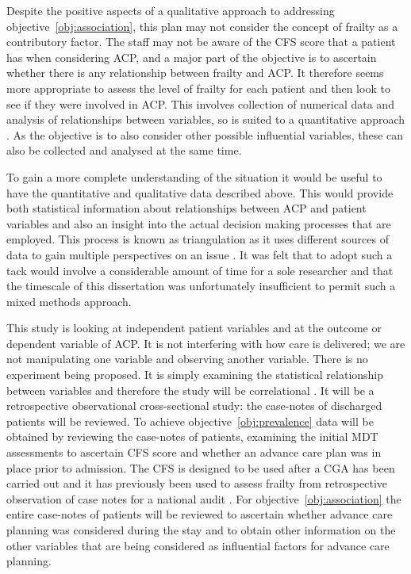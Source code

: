 \documentclass
[
	12pt,
	a4paper,
	oneside,
]{report}
\begin{document}
Despite the positive aspects of a qualitative approach to addressing 
objective~\ref{obj:association}, this plan may not consider the concept of 
frailty
as a contributory factor. The staff may not be aware of the CFS score
that a patient has when considering ACP, and a major part of the objective
is to ascertain whether there is any relationship between frailty and ACP.
It therefore seems more appropriate to assess the level of frailty for each
patient and then look to see if they were involved in ACP. This involves
collection of numerical data and analysis of relationships between variables, 
so is suited to a quantitative approach \parencite{parahoo:14}. As the objective
is to also consider other possible influential variables, these can also
be collected and analysed at the same time.

To gain a more complete understanding of the situation it would be useful to 
have the quantitative and qualitative data described above. This would provide
both statistical information about relationships between ACP and patient
variables and also an insight into the actual decision making processes
that are employed. This process is known as triangulation as it uses different
sources of data to gain multiple perspectives on an issue 
\parencite{biggam:15}. It was felt that to adopt such a tack would involve a 
considerable amount of time for a sole researcher and that the timescale of 
this dissertation was unfortunately insufficient to permit such a mixed 
methods approach.

This study is looking at independent patient variables and at the outcome or
dependent variable 
of ACP. It is not interfering with how care is delivered; we are not 
manipulating one
variable and observing another variable. There is no experiment being proposed.
It is simply examining the statistical relationship between variables and
therefore the 
study will be correlational \parencite{field:09}. It will be a retrospective 
observational 
cross-sectional study: the case-notes of discharged patients will be reviewed.
To achieve objective~\ref{obj:prevalence} data will be obtained by reviewing 
the case-notes of patients, examining the initial MDT assessments to ascertain 
CFS score and whether an advance care plan was in place prior to admission. The
CFS is designed to be used after a CGA has been carried out \parencite{bgs:14}
and it has previously been used to assess frailty from retrospective observation 
of case notes for a national audit \parencite{subbe:13}. 
For objective~\ref{obj:association} the entire case-notes of patients 
will be reviewed to ascertain whether advance care planning was considered 
during the stay and to obtain other information on the other variables that are
being considered as influential factors for advance care planning.
\end{document}
